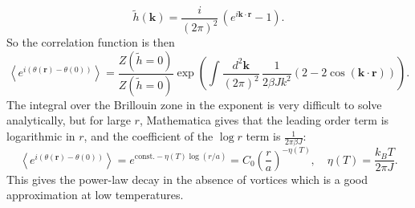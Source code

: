 \documentclass[a4paper,10pt]{article}
\newcommand{\beq}{\begin{equation}}
\newcommand{\eeq}{\end{equation}}
\renewcommand{\b}{\beta}
\renewcommand{\th}{\theta}
\newcommand{\avg}[1]{\left \langle #1 \right \rangle}
\newcommand{\paren}[1]{\left(#1\right)}
\newcommand{\recip}[1]{\frac{1}{#1}}
\newcommand{\cosp}[1]{\cos{\paren{#1}}}
\newcommand{\bv}[1]{\mathbf{#1}}
\renewcommand{\Dot}[2]{\ensuremath{\bv{#1}\cdot\bv{#2}}}
\newcommand{\br}{\ensuremath{\bv{r}}}
\begin{document}
\beq \tilde h(\bv k) = \frac{i}{(2\pi)^2}\, \paren{ e^{i 
\Dot{k}{r}} - 1 }.\eeq
So the correlation function is then
\beq \avg{e^{i(\th(\br) - \th(0))}} = \frac{Z(\tilde h = 0)}{Z(\tilde h = 0)} 
\exp\paren{ \int \frac{d^2\bv k}{(2\pi)^2}\, \frac{1}{2 \b J k^2} 
\paren{2 - 2\cosp{\Dot kr}}} .\eeq
The integral over the Brillouin zone in the exponent is very difficult to solve 
analytically, but for large $r$, Mathematica gives that the leading order term 
is logarithmic in $r$, and the coefficient of the $\log r$ term is $\recip{2\pi 
\b J}$:
\beq \avg{e^{i(\th(\br) - \th(0))}} = e^{\mathrm{const.} - \eta(T)\log(r/a)} = 
C_0 \paren{\frac{r}{a}}^{-\eta(T)}, \quad \eta(T) = \frac{k_BT}{2\pi J}. \eeq
This gives the power-law decay in the absence of vortices which is a good 
approximation at low temperatures.




\end{document}
